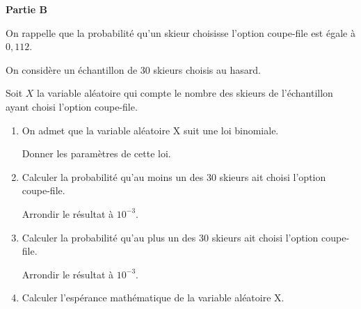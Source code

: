\textbf{\large Partie B}

\medskip

On rappelle que la probabilité qu'un skieur choisisse l'option coupe-file est égale à $0,112$.

\smallskip

On considère un échantillon de 30 skieurs choisis au hasard.

\smallskip

Soit $X$ la variable aléatoire qui compte le nombre des skieurs de l'échantillon ayant choisi l'option coupe-file.

\begin{enumerate}
	\item On admet que la variable aléatoire X suit une loi binomiale.
	
	Donner les paramètres de cette loi.
	\item Calculer la probabilité qu'au moins un des 30 skieurs ait choisi l'option coupe-file.
	
	Arrondir le résultat à $10^{-3}$.
	\item Calculer la probabilité qu'au plus un des 30 skieurs ait choisi l'option coupe-file.
	
	Arrondir le résultat à $10^{-3}$.
	\item Calculer l'espérance mathématique de la variable aléatoire X.
\end{enumerate}

